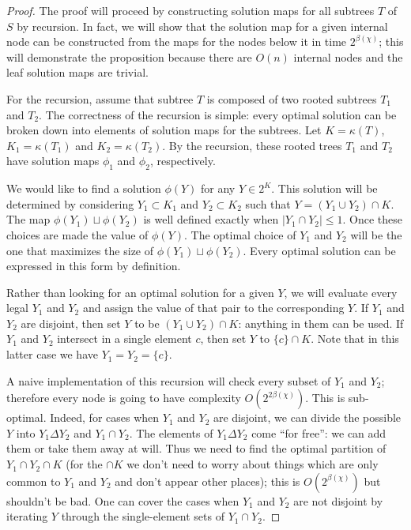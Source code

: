 \documentclass{amsart}
\newcommand{\col}{\chi}
\newcommand{\symmdiff}{\Delta}
\newcommand{\cut}{\kappa}
\newcommand{\bad}{\beta}
\begin{document}
\begin{proof}

The proof will proceed by constructing solution maps for all subtrees $T$ of $S$ by recursion.
In fact, we will show that the solution map for a given internal node can be constructed from the maps for the nodes below it in time $2^{\bad(\col)}$;
this will demonstrate the proposition because there are $O(n)$ internal nodes and the leaf solution maps are trivial.

For the recursion, assume that subtree $T$ is composed of two rooted subtrees $T_1$ and $T_2$.
The correctness of the recursion is simple: every optimal solution can be broken down into elements of solution maps for the subtrees.
Let $K = \cut(T)$, $K_1 = \cut(T_1)$ and $K_2 = \cut(T_2)$.
By the recursion, these rooted trees $T_1$ and $T_2$ have solution maps $\phi_1$ and $\phi_2$, respectively.

We would like to find a solution $\phi(Y)$ for any $Y \in 2^K$.
This solution will be determined by considering $Y_1 \subset K_1$ and $Y_2 \subset K_2$ such that $Y = (Y_1 \cup Y_2) \cap K$.
The map $\phi(Y_1) \sqcup \phi(Y_2)$ is well defined exactly when $|Y_1 \cap Y_2| \leq 1$.
Once these choices are made the value of $\phi(Y)$.
The optimal choice of $Y_1$ and $Y_2$ will be the one that maximizes the size of $\phi(Y_1) \sqcup \phi(Y_2)$.
Every optimal solution can be expressed in this form by definition.

Rather than looking for an optimal solution for a given $Y$, we will evaluate every legal $Y_1$ and $Y_2$ and assign the value of that pair to the corresponding $Y$.
If $Y_1$ and $Y_2$ are disjoint, then set $Y$ to be $(Y_1 \cup Y_2) \cap K$: anything in them can be used.
If $Y_1$ and $Y_2$ intersect in a single element $c$, then set $Y$ to $\{c\} \cap K$.
Note that in this latter case we have $Y_1 = Y_2 = \{c\}$.

A naive implementation of this recursion will check every subset of $Y_1$ and $Y_2$; therefore every node is going to have complexity $O(2^{2 \bad(\col)})$.
This is sub-optimal.
Indeed, for cases when $Y_1$ and $Y_2$ are disjoint, we can divide the possible $Y$ into $Y_1 \symmdiff Y_2$ and $Y_1 \cap Y_2$.
The elements of $Y_1 \symmdiff Y_2$ come ``for free'': we can add them or take them away at will.
Thus we need to find the optimal partition of $Y_1 \cap Y_2 \cap K$ (for the $\cap K$ we don't need to worry about things which are only common to $Y_1$ and $Y_2$ and don't appear other places); this is $O(2^{\bad(\col)})$ but shouldn't be bad.
One can cover the cases when $Y_1$ and $Y_2$ are not disjoint by iterating $Y$ through the single-element sets of $Y_1 \cap Y_2$.

\end{proof}
\end{document}

